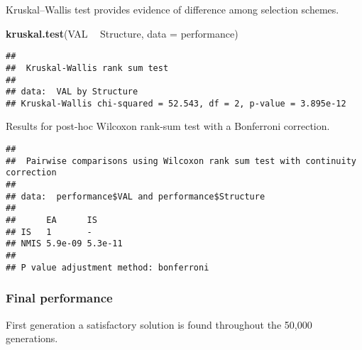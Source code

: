 \documentclass[]{book}
\newenvironment{Shaded}{\begin{snugshade}}{\end{snugshade}}
\newcommand{\DataTypeTok}[1]{\textcolor[rgb]{0.13,0.29,0.53}{#1}}
\newcommand{\KeywordTok}[1]{\textcolor[rgb]{0.13,0.29,0.53}{\textbf{#1}}}
\newcommand{\NormalTok}[1]{#1}
\newcommand{\OperatorTok}[1]{\textcolor[rgb]{0.81,0.36,0.00}{\textbf{#1}}}
\newcommand{\OtherTok}[1]{\textcolor[rgb]{0.56,0.35,0.01}{#1}}
\newcommand{\StringTok}[1]{\textcolor[rgb]{0.31,0.60,0.02}{#1}}
\begin{document}
Kruskal--Wallis test provides evidence of difference among selection schemes.

\begin{Shaded}
\begin{Highlighting}[]
\KeywordTok{kruskal.test}\NormalTok{(VAL }\OperatorTok{~}\StringTok{ }\NormalTok{Structure, }\DataTypeTok{data =}\NormalTok{ performance)}
\end{Highlighting}
\end{Shaded}

\begin{verbatim}
## 
##  Kruskal-Wallis rank sum test
## 
## data:  VAL by Structure
## Kruskal-Wallis chi-squared = 52.543, df = 2, p-value = 3.895e-12
\end{verbatim}

Results for post-hoc Wilcoxon rank-sum test with a Bonferroni correction.

\begin{Shaded}
\end{Shaded}

\begin{verbatim}
## 
##  Pairwise comparisons using Wilcoxon rank sum test with continuity correction 
## 
## data:  performance$VAL and performance$Structure 
## 
##      EA      IS     
## IS   1       -      
## NMIS 5.9e-09 5.3e-11
## 
## P value adjustment method: bonferroni
\end{verbatim}

\hypertarget{final-performance-2}{%
\subsubsection{Final performance}\label{final-performance-2}}

First generation a satisfactory solution is found throughout the 50,000 generations.
\end{document}
